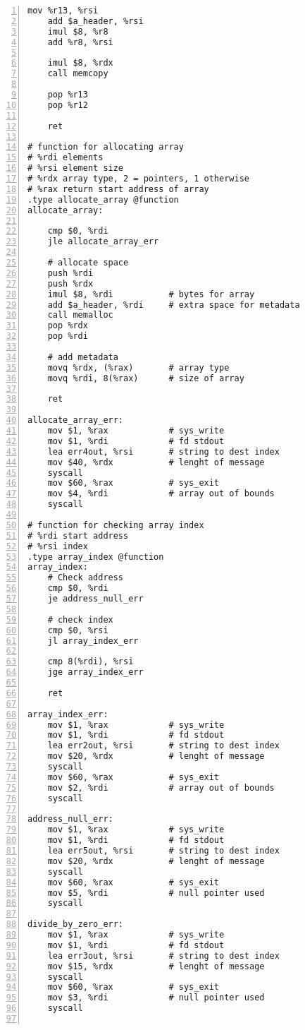 \documentclass{article}
\begin{document}
\begin{lstlisting}[numbers=left, firstnumber=1]
    mov %r13, %rsi
    add $a_header, %rsi
    imul $8, %r8
    add %r8, %rsi

    imul $8, %rdx
    call memcopy

    pop %r13
    pop %r12

    ret

# function for allocating array
# %rdi elements
# %rsi element size
# %rdx array type, 2 = pointers, 1 otherwise
# %rax return start address of array
.type allocate_array @function
allocate_array:
    
    cmp $0, %rdi
    jle allocate_array_err
        
    # allocate space
    push %rdi
    push %rdx
    imul $8, %rdi           # bytes for array
    add $a_header, %rdi     # extra space for metadata
    call memalloc
    pop %rdx
    pop %rdi
    
    # add metadata
    movq %rdx, (%rax)       # array type
    movq %rdi, 8(%rax)      # size of array
    
    ret

allocate_array_err:
    mov $1, %rax 			# sys_write
	mov $1, %rdi			# fd stdout 
	lea err4out, %rsi		# string to dest index
	mov $40, %rdx			# lenght of message 
	syscall     
	mov $60, %rax			# sys_exit
	mov $4, %rdi 			# array out of bounds
	syscall

# function for checking array index
# %rdi start address
# %rsi index
.type array_index @function
array_index:    
    # Check address
    cmp $0, %rdi
    je address_null_err

    # check index
    cmp $0, %rsi
    jl array_index_err
    
    cmp 8(%rdi), %rsi
    jge array_index_err
     
    ret

array_index_err:
    mov $1, %rax 			# sys_write
	mov $1, %rdi			# fd stdout 
	lea err2out, %rsi		# string to dest index
	mov $20, %rdx			# lenght of message 
	syscall 
	mov $60, %rax			# sys_exit
	mov $2, %rdi 			# array out of bounds
	syscall

address_null_err:
    mov $1, %rax 			# sys_write
	mov $1, %rdi			# fd stdout 
	lea err5out, %rsi		# string to dest index
	mov $20, %rdx			# lenght of message 
	syscall 
	mov $60, %rax			# sys_exit
	mov $5, %rdi 			# null pointer used
	syscall
    
divide_by_zero_err:
    mov $1, %rax 			# sys_write
	mov $1, %rdi			# fd stdout 
	lea err3out, %rsi		# string to dest index
	mov $15, %rdx			# lenght of message 
	syscall 
	mov $60, %rax			# sys_exit
	mov $3, %rdi 			# null pointer used
	syscall


\end{lstlisting}
\end{document}
